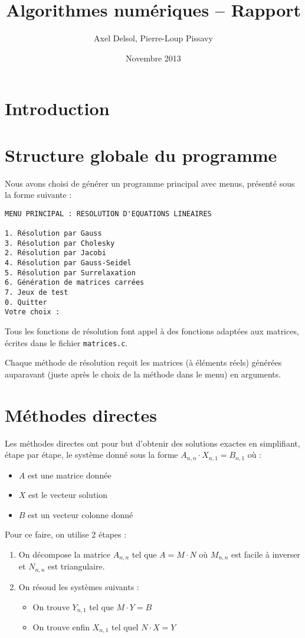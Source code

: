 \documentclass{report}
\title{Algorithmes numériques -- Rapport}
\author{Axel Delsol, Pierre-Loup Pissavy}
\date{Novembre 2013}
\begin{document}
  \maketitle
  \tableofcontents

  \chapter*{Introduction}
    \lipsum[1-5]
  \chapter{Structure globale du programme}
    Nous avons choisi de générer un programme principal avec menus, présenté sous la forme suivante :
    \begin{lstlisting}[linewidth=14cm,frame=single,breaklines=true, breakatwhitespace=true]
MENU PRINCIPAL : RESOLUTION D'EQUATIONS LINEAIRES

1. Résolution par Gauss
3. Résolution par Cholesky
2. Résolution par Jacobi
4. Résolution par Gauss-Seidel
5. Résolution par Surrelaxation
6. Génération de matrices carrées
7. Jeux de test
0. Quitter
Votre choix : 
	\end{lstlisting}
	Tous les fonctions de résolution font appel à des fonctions adaptées aux matrices, écrites dans le fichier \verb"matrices.c".
    
    Chaque méthode de résolution reçoit les matrices (à éléments réels) générées auparavant (juste après le choix de la méthode dans le menu) en arguments.
    
  \chapter{Méthodes directes}
    Les méthodes directes ont pour but d'obtenir des solutions exactes en simplifiant, étape par étape, le système donné sous la forme 
    $A_{n,n} \cdot X_{n,1} = B_{n,1}$ où :
    \begin{itemize}
     \item{$A$ est une matrice donnée}
     \item{$X$ est le vecteur solution}
     \item{$B$ est un vecteur colonne donné}
    \end{itemize}
    Pour ce faire, on utilise 2 étapes :
    \begin{enumerate}
     \item{On décompose la matrice $A_{n,n}$ tel que $A = M \cdot N$ où $M_{n,n}$ est facile à inverser et $N_{n,n}$ est triangulaire.}
     \item{On résoud les systèmes suivants : 
           \begin{itemize}
            \item{On trouve $Y_{n,1}$ tel que $M \cdot Y = B$}
            \item{On trouve enfin $X_{n,1} $ tel quel $N \cdot X = Y$}
           \end{itemize}
           }
    \end{enumerate}
\end{document}
